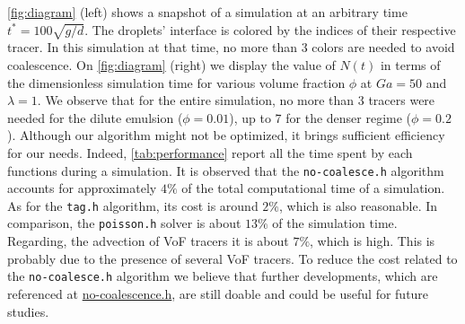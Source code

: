 \ref{fig:diagram} (left) shows a snapshot of a simulation at an arbitrary time $t^* = 100 \sqrt{g/d}$. 
The droplets' interface is colored by the indices of their respective tracer. 
In this simulation at that time, no more than 3 colors are needed to avoid coalescence.
On \ref{fig:diagram} (right) we display the value of $N(t)$ in terms of the dimensionless simulation time for various volume fraction $\phi$ at $Ga = 50$ and  $\lambda = 1$. 
We observe that for the entire simulation, no more than 3 tracers were needed for the dilute emulsion ($\phi = 0.01$), up to 7 for the denser regime ($\phi = 0.2$). 
Although our algorithm might not be optimized, it brings sufficient efficiency for our needs. 
Indeed, \ref{tab:performance} report all the time spent by each functions during a simulation. 
It is observed that the \texttt{no-coalesce.h} algorithm accounts for approximately $4\%$ of the total computational time of a simulation. 
As for the \texttt{tag.h} algorithm, its cost is around $2\%$, which is also reasonable.
In comparison, the \texttt{poisson.h} solver is about $13\%$ of the simulation time. 
Regarding, the advection of VoF tracers it is about $7\%$, which is high.
This is probably due to the presence of several VoF tracers.
To reduce the cost related to the \texttt{no-coalesce.h} algorithm we believe that further developments, which are referenced at \href{http://basilisk.fr/sandbox/fintzin/Rising-Suspenion/no-coalescence.h}{no-coalescence.h}, are still doable and could be useful for future studies.
